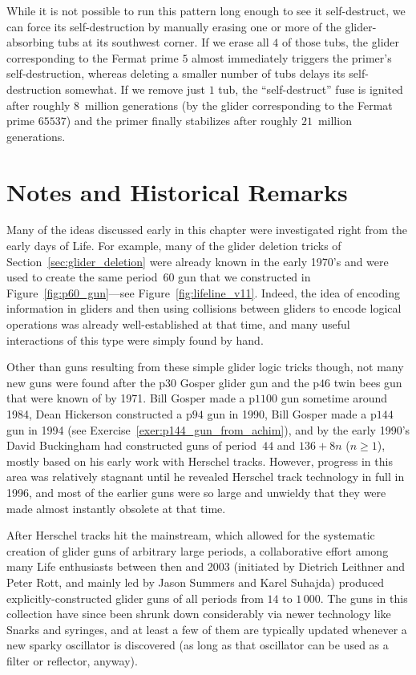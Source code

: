 While it is not possible to run this pattern long enough to see it self-destruct, we can force its self-destruction by manually erasing one or more of the glider-absorbing tubs at its southwest corner. If we erase all $4$ of those tubs, the glider corresponding to the Fermat prime $5$ almost immediately triggers the primer's self-destruction, whereas deleting a smaller number of tubs delays its self-destruction somewhat. If we remove just $1$ tub, the ``self-destruct'' fuse is ignited after roughly $8$~million generations (by the glider corresponding to the Fermat prime $65537$) and the primer finally stabilizes after roughly $21$~million generations.


\section{Notes and Historical Remarks}\label{sec:glider_guns_history}

Many of the ideas discussed early in this chapter were investigated right from the early days of Life. For example, many of the glider deletion tricks of Section~\ref{sec:glider_deletion} were already known in the early 1970's and were used to create the same period~$60$ gun that we constructed in Figure~\ref{fig:p60_gun}---see Figure~\ref{fig:lifeline_v11}. Indeed, the idea of encoding information in gliders and then using collisions between gliders to encode logical operations was already well-established at that time, and many useful interactions of this type were simply found by hand.

Other than guns resulting from these simple glider logic tricks though, not many new guns were found after the p$30$ Gosper glider gun and the p$46$ twin bees gun that were known of by 1971. Bill Gosper made a p$1100$ gun sometime around 1984, Dean Hickerson constructed a p$94$ gun in 1990, Bill Gosper made a p$144$ gun in 1994 (see Exercise~\ref{exer:p144_gun_from_achim}), and by the early 1990's David Buckingham had constructed guns of period~$44$ and $136+8n$ ($n \geq 1$), mostly based on his early work with Herschel tracks. However, progress in this area was relatively stagnant until he revealed Herschel track technology in full in 1996, and most of the earlier guns were so large and unwieldy that they were made almost instantly obsolete at that time.

After Herschel tracks hit the mainstream, which allowed for the systematic creation of glider guns of arbitrary large periods, a collaborative effort among many Life enthusiasts between then and 2003 (initiated by Dietrich Leithner and Peter Rott, and mainly led by Jason Summers and Karel Suhajda) produced explicitly-constructed glider guns of all periods from $14$ to $1\, 000$. The guns in this collection have since been shrunk down considerably via newer technology like Snarks and syringes, and at least a few of them are typically updated whenever a new sparky oscillator is discovered (as long as that oscillator can be used as a filter or reflector, anyway).

